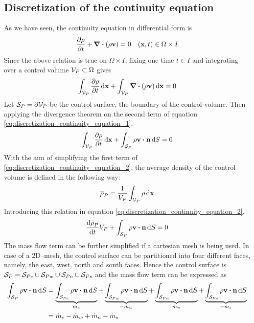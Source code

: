 
\subsection{Discretization of the continuity equation}

As we have seen, the continuity equation in differential form is
\begin{equation}
	\pdv{\rho}{t} + \div(\rho \vb{v}) = 0 \quad (\vb{x},t) \in \Omega \times I
\end{equation}
Since the above relation is true on $\Omega \times I$, fixing one time $t \in I$ and integrating over a control volume $\mathcal{V}_{P} \subset \Omega$ gives
\begin{equation} \label{eq:discretization_continuity_equation_1}
	\int_{\mathcal{V}_{P}} \pdv{\rho}{t} \dd{\vb{x}} + \int_{\mathcal{V}_{P}} \div(\rho \vb{v}) \dd{\vb{x}} = 0
\end{equation}
Let $\mathcal{S}_{P} = \partial \mathcal{V}_{P}$ be the control surface, \ie the boundary of the control volume. Then applying the divergence theorem on the second term of equation \eqref{eq:discretization_continuity_equation_1},
\begin{equation} \label{eq:discretization_continuity_equation_2}
	\int_{\cv{P}} \pdv{\rho}{t} \dd{\vb{x}} + 
	\int_{\cs{P}} \rho \vb{v} \vdot \vb{n} \dd{S} = 0
\end{equation}
With the aim of simplifying the first term of \eqref{eq:discretization_continuity_equation_2}, the average density of the control volume is defined in the following way:
\begin{equation}
	\overline{\rho}_P = \frac{1}{V_P} \int_{\mathcal{V}_{P}} \rho \dd{\vb{x}}
\end{equation}
Introducing this relation in equation \eqref{eq:discretization_continuity_equation_2},
\begin{equation} \label{eq:discretization_continuity_equation_3}
	\frac{\dd \overline{\rho}_P}{\dd{t}} V_P + 
	\int_{\cs{P}} \rho \vb{v} \vdot \vb{n} \dd{S} = 0
\end{equation}
The mass flow term can be further simplified if a cartesian mesh is being used. In case of a 2D--mesh, the control surface can be partitioned into four different faces, namely, the east, west, north and south faces. Hence the control surface is $\mathcal{S}_{P} = \mathcal{S}_{Pe} \cup \mathcal{S}_{Pw} \cup \mathcal{S}_{Pn} \cup \mathcal{S}_{Ps}$ and the mass flow term can be expressed as
\begin{align}
	\int_{\cs{P}} \rho \vb{v} \vdot \vb{n} \dd{S} 
	&= 
	\underbrace{\int_{\cs{Pe}} \rho \vb{v} \vdot \vb{n} \dd{S}}_{\dot{m}_e}
	+ \underbrace{\int_{\cs{Pw}} \rho \vb{v} \vdot \vb{n} \dd{S}}_{-\dot{m}_w}
	+ \underbrace{\int_{\cs{Pn}} \rho \vb{v} \vdot \vb{n} \dd{S}}_{\dot{m}_n}
	+ \underbrace{\int_{\cs{Ps}} \rho \vb{v} \vdot \vb{n} \dd{S}}_{-\dot{m}_s} \nonumber \\
	&= \dot{m}_e - \dot{m}_w + \dot{m}_n - \dot{m}_s \label{eq:discretization_continuity_equation_7}
\end{align}
